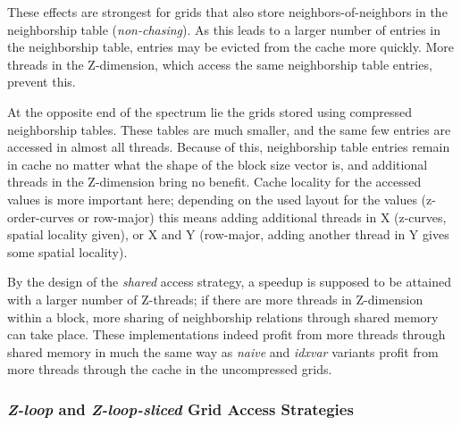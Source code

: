 These effects are strongest for grids that also store neighbors-of-neighbors in the neighborship table (\emph{non-chasing}). As this leads to a larger number of entries in the neighborship table, entries may be evicted from the cache more quickly. More threads in the Z-dimension, which access the same neighborship table entries, prevent this.

At the opposite end of the spectrum lie the grids stored using compressed neighborship tables. These tables are much smaller, and the same few entries are accessed in almost all threads. Because of this, neighborship table entries remain in cache no matter what the shape of the block size vector is, and additional threads in the Z-dimension bring no benefit. Cache locality for the accessed values is more important here; depending on the used layout for the values (z-order-curves or row-major) this means adding additional threads in X (z-curves, spatial locality given), or X and Y (row-major, adding another thread in Y gives some spatial locality).

By the design of the \emph{shared} access strategy, a speedup is supposed to be attained with a larger number of Z-threads; if there are more threads in Z-dimension within a block, more sharing of neighborship relations through shared memory can take place. These implementations indeed profit from more threads through shared memory in much the same way as \emph{naive} and \emph{idxvar} variants profit from more threads through the cache in the uncompressed grids.

\subsubsection{\emph{Z-loop} and \emph{Z-loop-sliced} Grid Access Strategies}

